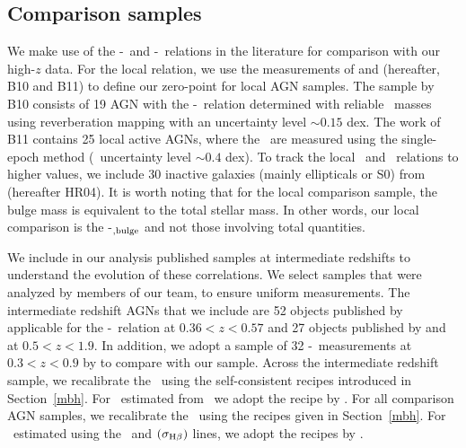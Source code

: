 \documentclass[apj]{emulateapj}
\begin{document}
\subsection{Comparison samples}\label{sec:compare_sample}

We make use of the \mbh-\lhost\ and \mbh-\smass\ relations in the literature for comparison with our high-$z$ data. For the local relation, we use the measurements of \citet{Ben++10} and \citet{Bennert++2011} (hereafter, B10 and B11) to define our zero-point for local AGN samples. The sample by B10 consists of 19 AGN with the \mbh-\lhost\ relation determined with reliable \mbh\ masses using reverberation mapping with an uncertainty level $\sim0.15$ dex. The work of B11 contains 25 local active AGNs, where the \mbh\ are measured using the single-epoch method (\mbh\ uncertainty level $\sim0.4$ dex). To track the local \smass\ and \mbh\  relations to higher values, we include 30 inactive galaxies (mainly ellipticals or S0) from \citet{H+R04} (hereafter HR04). It is worth noting that for the local comparison sample, the bulge mass is equivalent to the total stellar mass. In other words, our local comparison is the \mbh-\smass$_{\rm ,bulge}$ and not those involving total quantities.

We include in our analysis published samples at intermediate redshifts to understand the evolution of these correlations. We select samples that were analyzed by members of our team, to ensure uniform measurements. The intermediate redshift AGNs that we include are 52 objects published by \citet{Park15} applicable for the \mbh-\lhost\ relation at $0.36<z<0.57$ and 27 objects published by \citet{Bennert11} and \citet{SS13} at $0.5<z<1.9$. In addition, we adopt a sample of 32 \mbh-\smass\ measurements at $0.3<z<0.9$ by \citet{Cisternas2011} to compare with our sample. Across the intermediate redshift sample, we recalibrate the \mbh\ using the self-consistent recipes introduced in Section~\ref{mbh}. For \mbh\ estimated from \Mgii\, we adopt the recipe by \citet{Ding2017b}. For all comparison AGN samples, we recalibrate the \mbh\ using the recipes given in Section~\ref{mbh}. For \mbh\ estimated using the \Mgii\ and  \hbeta$(\sigma_{\rm H\beta})$ lines, we adopt the recipes by \citet{Ding2017b}.
\end{document}
